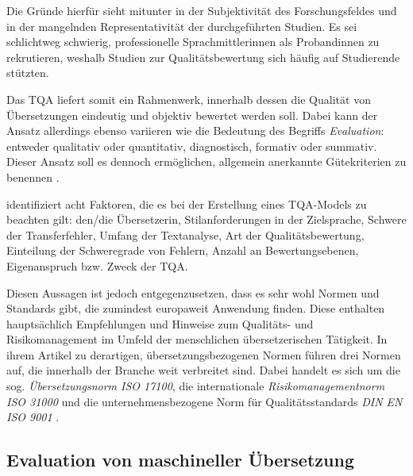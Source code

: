 Die Gründe hierfür sieht \citet[279]{pym_translation_1992} mitunter in der Subjektivität des Forschungsfeldes und in der mangelnden Representativität der durchgeführten Studien. Es sei schlichtweg schwierig, professionelle Sprachmittler{\textperiodcentered}innen als Proband{\textperiodcentered}innen zu rekrutieren, weshalb Studien zur Qualitätsbewertung sich häufig auf Studierende stützten.

Das TQA liefert somit ein Rahmenwerk, innerhalb dessen die Qualität von Übersetzungen eindeutig und objektiv bewertet werden soll. Dabei kann der Ansatz allerdings ebenso variieren wie die Bedeutung des Begriffs \emph{Evaluation}: entweder qualitativ oder quantitativ, diagnostisch, formativ oder summativ. Dieser Ansatz soll es dennoch ermöglichen, allgemein anerkannte Gütekriterien zu benennen \citep[4]{williams_translation_2009}.

\citet[5]{williams_translation_2009} identifiziert acht Faktoren, die es bei der Erstellung eines TQA-Models zu beachten gilt: den/die Übersetzer{\textperiodcentered}in, Stilanforderungen in der Zielsprache, Schwere der Transferfehler, Umfang der Textanalyse, Art der Qualitätsbewertung, Einteilung der Schweregrade von Fehlern, Anzahl an Bewertungsebenen, Eigenanspruch bzw. Zweck der TQA. 

Diesen Aussagen ist jedoch entgegenzusetzen, dass es sehr wohl Normen und Standards gibt, die zumindest europaweit Anwendung finden. Diese enthalten hauptsächlich Empfehlungen und Hinweise zum Qualitäts- und Risikomanagement im Umfeld der menschlichen übersetzerischen Tätigkeit. In ihrem Artikel zu derartigen, übersetzungsbezogenen Normen führen \citet{canfora_im_2015} drei Normen auf, die innerhalb der Branche weit verbreitet sind. Dabei handelt es sich um die sog. \emph{Übersetzungsnorm ISO 17100}, die internationale \emph{Risikomanagementnorm ISO 31000} und die unternehmensbezogene Norm für Qualitätsstandards \emph{DIN EN ISO 9001} \citep[]{canfora_im_2015}.





\subsection{Evaluation von maschineller Übersetzung}
\label{K3:subsec:EvaMT}

